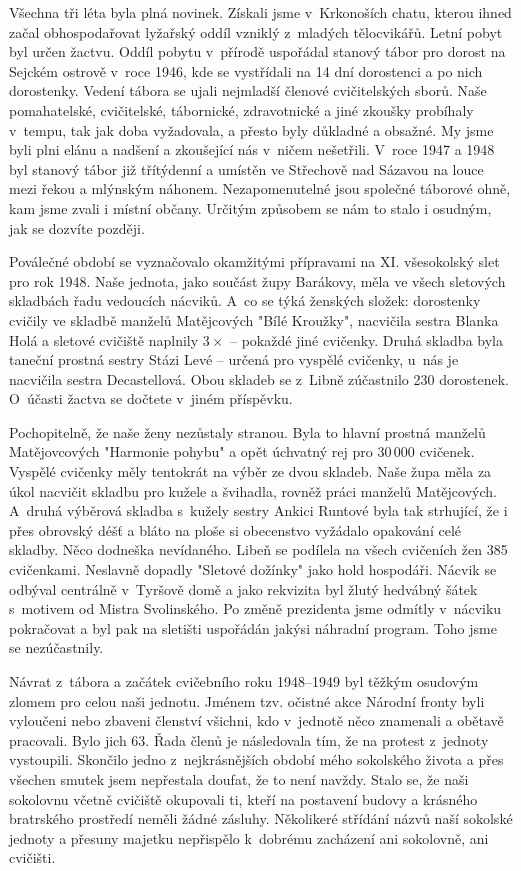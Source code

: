 \documentclass[a5paper, 11pt, twoside]{article}
\begin{document}
Všechna tři léta byla plná novinek. Získali jsme v~Krkonoších chatu,
kterou ihned začal obhospodařovat lyžařský oddíl vzniklý z~mladých
tělocvikářů. Letní pobyt byl určen žactvu. Oddíl pobytu v~přírodě
uspořádal stanový tábor pro dorost na Sejckém ostrově v~roce 1946, kde
se vystřídali na 14 dní dorostenci a po nich dorostenky. Vedení tábora
se ujali nejmladší členové cvičitelských sborů. Naše pomahatelské,
cvičitelské, tábornické, zdravotnické a jiné zkoušky probíhaly v~tempu,
tak jak doba vyžadovala, a přesto byly důkladné a obsažné. My jsme byli
plni elánu a nadšení a zkoušející nás v~ničem nešetřili. V~roce 1947 a
1948 byl stanový tábor již třítýdenní a umístěn ve Střechově nad Sázavou
na louce mezi řekou a mlýnským náhonem. Nezapomenutelné jsou společné
táborové ohně, kam jsme zvali i místní občany. Určitým způsobem se nám
to stalo i osudným, jak se dozvíte později.

Poválečné období se vyznačovalo okamžitými přípravami na XI. všesokolský
slet pro rok 1948. Naše jednota, jako součást župy Barákovy, měla ve
všech sletových skladbách řadu vedoucích nácviků. A~co se týká ženských
složek: dorostenky cvičily ve skladbě manželů Matějcových "Bílé
Kroužky", nacvičila sestra Blanka Holá a sletové cvičiště naplnily \(3\times\)
-- pokaždé jiné cvičenky. Druhá skladba byla taneční prostná sestry
Stázi Levé -- určená pro vyspělé cvičenky, u~nás je nacvičila sestra
Decastellová. Obou skladeb se z~Libně zúčastnilo 230 dorostenek.
O~účasti žactva se dočtete v~jiném příspěvku.

Pochopitelně, že naše ženy nezůstaly stranou. Byla to hlavní prostná
manželů Matějovcových "Harmonie pohybu" a opět úchvatný rej pro 30\,000
cvičenek. Vyspělé cvičenky měly tentokrát na výběr ze dvou skladeb. Naše
župa měla za úkol nacvičit skladbu pro kužele a švihadla, rovněž práci
manželů Matějcových. A~druhá výběrová skladba s~kužely sestry Ankici
Runtové byla tak strhující, že i přes obrovský déšť a bláto na ploše si
obecenstvo vyžádalo opakování celé skladby. Něco dodneška nevídaného.
Libeň se podílela na všech cvičeních žen 385 cvičenkami. Neslavně
dopadly "Sletové dožínky" jako hold hospodáři. Nácvik se odbýval
centrálně v~Tyršově domě a jako rekvizita byl žlutý hedvábný šátek
s~motivem od Mistra Svolinského. Po změně prezidenta jsme odmítly
v~nácviku pokračovat a byl pak na sletišti uspořádán jakýsi náhradní
program. Toho jsme se nezúčastnily.

Návrat z~tábora a začátek cvičebního roku 1948--1949 byl
těžkým osudovým zlomem pro celou naši jednotu. Jménem tzv. očistné akce
Národní fronty byli vyloučeni nebo zbaveni členství všichni, kdo
v~jednotě něco znamenali a obětavě pracovali. Bylo jich 63. Řada členů je
následovala tím, že na protest z~jednoty vystoupili. Skončilo jedno
z~nejkrásnějších období mého sokolského života a přes všechen smutek jsem
nepřestala doufat, že to není navždy. Stalo se, že naši sokolovnu včetně
cvičiště okupovali ti, kteří na postavení budovy a krásného bratrského
prostředí neměli žádné zásluhy. Několikeré střídání názvů naší sokolské
jednoty a přesuny majetku nepřispělo k~dobrému zacházení ani sokolovně,
ani cvičišti.
\end{document}
